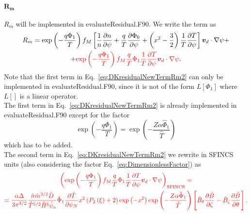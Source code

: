 \documentclass[12pt]{article}
\newcommand{\p}{\partial}
\newcommand{\na}{\nabla}
\begin{document}
\paragraph*{$\bm{R_m}$}
$R_m$ will be implemented in evaluateResidual.F90. We write the term as 
\begin{multline}
R_m = \exp \left(- \frac{q \Phi_1}{T}  \right) f_{M} \left[\frac{1}{n} \frac{\p n}{\p \psi} + \frac{q}{T} \frac{\p \Phi_0}{\p \psi} + \left(x^2 - \frac{3}{2}\right) \frac{1}{T} \frac{\p T}{\p \psi}\right] \bm{v}_d \cdot \na \psi + \\ +  \textcolor{red}{
  \exp \left(- \frac{q \Phi_1}{T}  \right) f_{M} \frac{q}{T} \Phi_1 \frac{1}{T} \frac{\p T}{\p \psi} \bm{v}_d \cdot \na \psi }.
\label{eq:DKresidualNewTermRm2}
\end{multline}
Note that the first term in Eq.~\ref{eq:DKresidualNewTermRm2} can only be implemented in evaluateResidual.F90, since it is not of the form $L\left[\Phi_1\right]$ where $L\left[\right]$ is a linear operator.\\
The first term in Eq.~\ref{eq:DKresidualNewTermRm2} is already implemented in evaluateResidual.F90 except for the factor 
\[
\exp \left(- \frac{q \Phi_1}{T}  \right) = \exp \left(- \frac{Z \alpha \hat{\Phi}_1}{\hat{T}}  \right)
\]
which has to be added.\\
The second term in Eq.~\ref{eq:DKresidualNewTermRm2} we rewrite in SFINCS units (also considering the factor Eq.~\ref{eq:DimensionlessFactor}) as
\begin{multline}
\textcolor{red}{
\left(\exp \left(- \frac{q \Phi_1}{T}  \right) f_{M} \frac{q}{T} \Phi_1 \frac{1}{T} \frac{\p T}{\p \psi} \bm{v}_d \cdot \na \psi\right)_{\mathrm{SFINCS}} = } \\ \textcolor{red}{ =
\frac{\alpha \Delta}{3 \pi^{3/2}} \frac{\hat{n} \hat{m}^{3/2} \hat{D}}{\hat{T}^{5/2} \hat{B}^3 \hat{\psi}_a} \hat{\Phi}_1 \frac{\p \hat{T}}{\p \psi_N}
x^2 \left(P_2\left(\xi\right) + 2\right)
\exp\left(-x^2\right) \exp \left(- \frac{Z \alpha \hat{\Phi}_1}{\hat{T}}\right) \left[\hat{B}_{\theta} \frac{\p \hat{B}}{\p \zeta} - \hat{B}_{\zeta} \frac{\p \hat{B}}{\p \theta}\right]. 
}
\label{eq:Rmterm2}
\end{multline}
\end{document}

